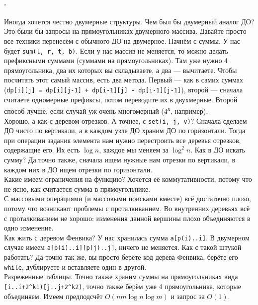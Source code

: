 \documentclass{article}
\newcommand{\pseudo}{PseudoLexer.py:PseudoLexer -x}
\newcommand{\pseudocode}[1]{\texttt{#1}}
\begin{document}
    \paragraph{.}
    Иногда хочется честно двумерные структуры. Чем был бы двумерный аналог ДО? Это были бы запросы на прямоугольниках двумерного массива. Давайте просто все техники перенесём с обычного ДО на двумерное. Начнём с суммы. У нас будет \pseudocode{sum(l, r, t, b)}. Если у нас массив не меняется, то можно делать префиксными суммами (суммами на прямоугольниках). Там уже нужно 4 прямоугольника, два их которых вы складываете, а два --- вычитаете. Чтобы посчитать этот самый массив, есть два метода. Первый --- как в самих суммах (\pseudocode{dp[i][j] = dp[i][j-1] + dp[i-1][j] - dp[i-1][j-1]}), второй --- сначала считаете одномерные префиксы, потом переводите их в двухмерные. Второй способ лучше, если случай уж очень многомерный (4\textsuperscript{х}, например).\\
    Хорошо, а как с деревом отрезков. А точнее, с \pseudocode{set(i, j, v)}? Сначала сделаем ДО чисто по вертикали, а в каждом узле ДО храним ДО по горизонтали. Тогда при операции задания элемента нам нужно перестроить все деревья отрезков, содержащие его. Их есть $\log n$, каждое мы меняем за $\log^2n$. Как в ДО искать сумму? Да точно также, сначала ищем нужные нам отрезки по вертикали, в каждом них в ДО ищем отрезки по горизонтали.\\
    Какие имеем ограничения на функцию? Хочется её коммутативности, потому что не ясно, как считается сумма в прямоугольнике.\\
    С массовыми операциями (и массовыми поисками вместе) всё достаточно плохо, потому что возникают проблемы с проталкиванием. Во внутренних деревьях всё с проталкиванием не хорошо: изменения данной вершины плохо объединяются в одно изменение.\\
    Как жить с деревом Фенвика? У нас хранилась сумма \pseudocode{a[p(i)..i]}. В двумерном случае имеем \pseudocode{a[p(i)..i][p(j)..j]}, ничего не меняется. Как с такой штукой работать? Да точно так же, вы просто берёте код дерева Фенвика, берёте его \pseudocode{while}, дублируете и вставляете один в другой.\\
    Разреженные таблицы. Точно также храним суммы на прямоугольниках вида \pseudocode{[i..i+2^k1)[j..j+2^k2)}, точно также берём уже 4 прямоугольника, которые объединяем. Имеем предподсчёт $O(nm\log n\log m)$ и запрос за $O(1)$.
\end{document}
